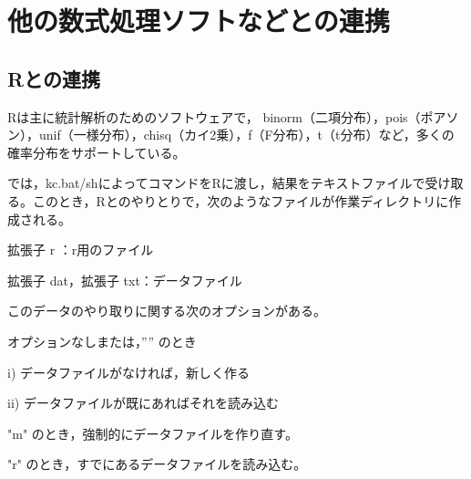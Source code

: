 \documentclass[papersize,a4paper,12pt,uplatex]{jsarticle}
\begin{document}
\section{他の数式処理ソフトなどとの連携}
\subsection{Rとの連携}

Rは主に統計解析のためのソフトウェアで，  binorm（二項分布），pois（ポアソン），unif（一様分布），chisq（カイ2乗），f（F分布），t（t分布）など，多くの確率分布をサポートしている。

  \ketcindy では，kc.bat/shによってコマンドをRに渡し，結果をテキストファイルで受け取る。このとき，Rとのやりとりで，次のようなファイルが作業ディレクトリに作成される。
  
拡張子 r ：r用のファイル

拡張子 dat，拡張子 txt：データファイル

このデータのやり取りに関する次のオプションがある。

  オプションなしまたは，”” のとき
  
    i) データファイルがなければ，新しく作る
    
    ii) データファイルが既にあればそれを読み込む
    
  "m"  のとき，強制的にデータファイルを作り直す。
  
  "r" のとき，すでにあるデータファイルを読み込む。
  
\vspace{\baselineskip}
\end{document}
